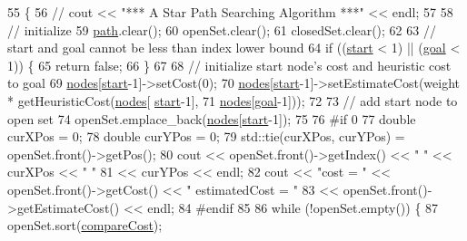 \begin{DoxyCode}
55                                              \{
56     \textcolor{comment}{// cout << "*** A Star Path Searching Algorithm ***" << endl;}
57 
58     \textcolor{comment}{// initialize}
59     \hyperlink{classPathFindingAlgorithm_ab177b2276cdf28fb77361bff19745b17}{path}.clear();
60     openSet.clear();
61     closedSet.clear();
62 
63     \textcolor{comment}{// start and goal cannot be less than index lower bound}
64     \textcolor{keywordflow}{if} ((\hyperlink{classPathFindingAlgorithm_a1c31bd6b8c57459c32ada19cf9bf412a}{start} < 1) || (\hyperlink{classPathFindingAlgorithm_ae8acf41f92ba72a969a44640c99fb8a4}{goal} < 1)) \{
65         \textcolor{keywordflow}{return} \textcolor{keyword}{false};
66     \}
67 
68     \textcolor{comment}{// initialize start node's cost and heuristic cost to goal}
69     \hyperlink{classPathFindingAlgorithm_a131201eeaf50772259161b509007e0aa}{nodes}[\hyperlink{classPathFindingAlgorithm_a1c31bd6b8c57459c32ada19cf9bf412a}{start}-1]->setCost(0);
70     \hyperlink{classPathFindingAlgorithm_a131201eeaf50772259161b509007e0aa}{nodes}[\hyperlink{classPathFindingAlgorithm_a1c31bd6b8c57459c32ada19cf9bf412a}{start}-1]->setEstimateCost(weight * getHeuristicCost(\hyperlink{classPathFindingAlgorithm_a131201eeaf50772259161b509007e0aa}{nodes}[
      \hyperlink{classPathFindingAlgorithm_a1c31bd6b8c57459c32ada19cf9bf412a}{start}-1],
71                                    \hyperlink{classPathFindingAlgorithm_a131201eeaf50772259161b509007e0aa}{nodes}[\hyperlink{classPathFindingAlgorithm_ae8acf41f92ba72a969a44640c99fb8a4}{goal}-1]));
72 
73     \textcolor{comment}{// add start node to open set}
74     openSet.emplace\_back(\hyperlink{classPathFindingAlgorithm_a131201eeaf50772259161b509007e0aa}{nodes}[\hyperlink{classPathFindingAlgorithm_a1c31bd6b8c57459c32ada19cf9bf412a}{start}-1]);
75 
76 \textcolor{preprocessor}{#if 0}
77 \textcolor{preprocessor}{}    \textcolor{keywordtype}{double} curXPos = 0;
78     \textcolor{keywordtype}{double} curYPos = 0;
79     std::tie(curXPos, curYPos) = openSet.front()->getPos();
80     cout << openSet.front()->getIndex() << \textcolor{stringliteral}{" "} << curXPos << \textcolor{stringliteral}{" "}
81          << curYPos << endl;
82     cout << \textcolor{stringliteral}{"cost = "} << openSet.front()->getCost() << \textcolor{stringliteral}{" estimatedCost = "}
83          << openSet.front()->getEstimateCost() << endl;
84 \textcolor{preprocessor}{#endif}
85 \textcolor{preprocessor}{}
86     \textcolor{keywordflow}{while} (!openSet.empty()) \{
87         openSet.sort(\hyperlink{AStarAlgorithm_8cpp_a24917ae77aa11fe6ccd7791689bca952}{compareCost});

\end{DoxyCode}
